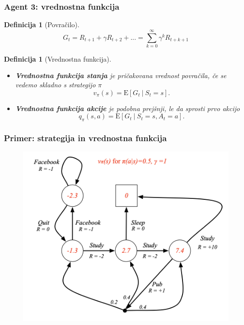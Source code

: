 \documentclass{beamer}    %
\newtheorem{definicija}[izrek]{Definicija}
\begin{document}
\begin{frame}
    \frametitle{Agent 3: vrednostna funkcija}
    \begin{definicija}[Povračilo]
        $$
        G_t = R_{t+1} + \gamma R_{t+2} + ... = \sum_{k=0}^\infty \gamma^k R_{t + k + 1}
        $$
    \end{definicija}
    \begin{definicija}[Vrednostna funkcija]
        \begin{itemize}
            \item \textbf{Vrednostna funkcija stanja} je pričakovana vrednost povračila, če se 
                    vedemo skladno s strategijo $\pi$ 
                    $$
                    v_\pi(s) = \mathrm{E} [G_t~|~S_t = s].
                    $$
            \item \textbf{Vrednostna funkcija akcije} je podobna prejšnji, le da sprosti prvo akcijo 
                    $$
                    q_\pi(s, a) = \mathrm{E} [G_t~|~S_t = s, A_t = a].
                    $$
        \end{itemize}
    \end{definicija}
\end{frame}


\begin{frame}
    \frametitle{Primer: strategija in vrednostna funkcija}
    \begin{figure}[b]
        \includegraphics[scale=0.6]{slike/strat-vrednost.png}
    \end{figure}
\end{frame}
\end{document}
